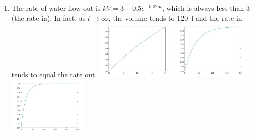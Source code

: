 \begin{enumerate}
\begin{enumerate}
      \item The rate of water flow out is $ kV = 3 - 0.5e^{-0.025t} $, which is always less than 3 (the rate in). In fact, as $ t \to \infty $,
            the volume tends to \SI{120}{\litre} and the rate in tends to equal the rate out.
            \includegraphics[width=0.3\textwidth]{leakybucket/01}
            \includegraphics[width=0.3\textwidth]{leakybucket/02}
            \includegraphics[width=0.3\textwidth]{leakybucket/03}
    \end{enumerate}
\end{enumerate}

